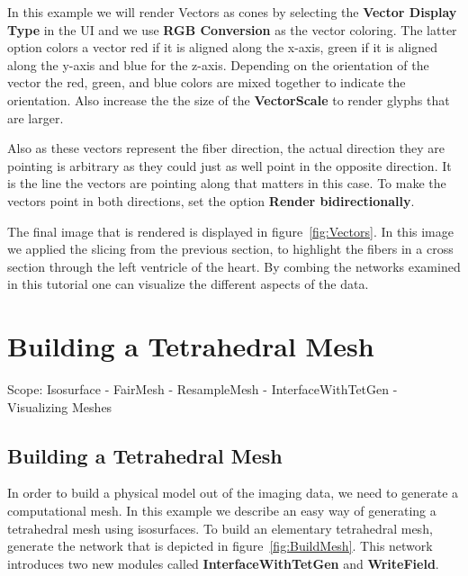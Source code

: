 \documentclass[fleqn,11pt,openany]{book}
\begin{document}
In this example we will render Vectors as cones by selecting the {\bf Vector Display Type} in the UI and we use {\bf RGB Conversion} as the vector coloring. The latter option colors a vector red if it is aligned along the x-axis, green if it is aligned along the y-axis and blue for the z-axis. Depending on the orientation of the vector the red, green, and blue colors are mixed together to indicate the orientation. Also increase the the size of the {\bf VectorScale} to render glyphs that are larger. 

Also as these vectors represent the fiber direction, the actual direction they are pointing is arbitrary as they could just as well point in the opposite direction. It is the line the vectors are pointing along that matters in this case. To make the vectors point in both directions, set the option {\bf Render bidirectionally}.

The final image that is rendered is displayed in figure~\ref{fig:Vectors}. In this image we applied the slicing from the previous section, to highlight the fibers in a cross section through the left ventricle of the heart. By combing the networks examined in this tutorial one can visualize the different aspects of the data.



\chapter{Building a Tetrahedral Mesh}

\begin{introduction}
Scope: Isosurface - FairMesh - ResampleMesh - InterfaceWithTetGen -  Visualizing Meshes 
\end{introduction}

\section{Building a Tetrahedral Mesh}

In order to build a physical model out of the imaging data, we need to generate a computational mesh. In this example we describe an easy way of generating a tetrahedral mesh using isosurfaces. To build an elementary tetrahedral mesh, generate the network that is depicted in figure~\ref{fig:BuildMesh}. This network introduces two new modules called {\bf InterfaceWithTetGen} and {\bf WriteField}. 
\end{document}
